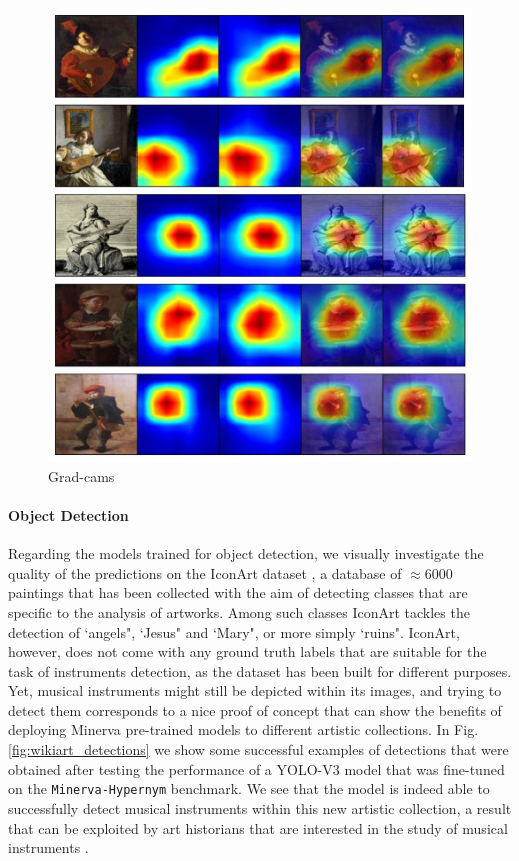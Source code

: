 \begin{figure}[ht!]
\centering
  \includegraphics[width=\linewidth]{./Images/Chapter05/grad_cams}
  \caption{Grad-cams}
  \label{fig:grad_cams}
\end{figure}


\paragraph{Object Detection}
Regarding the models trained for object detection, we visually investigate the quality of the predictions on the IconArt dataset \cite{gonthier2018weakly}, a database of $\approx 6000$ paintings that has been collected with the aim of detecting classes that are specific to the analysis of artworks. Among such classes IconArt tackles the detection of `angels", `Jesus" and `Mary", or more simply `ruins". IconArt, however, does not come with any ground truth labels that are suitable for the task of instruments detection, as the dataset has been built for different purposes. Yet, musical instruments might still be depicted within its images, and trying to detect them corresponds to a nice proof of concept that can show the benefits of deploying Minerva pre-trained models to different artistic collections. In Fig. \ref{fig:wikiart_detections} we show some successful examples of detections that were obtained after testing the performance of a YOLO-V3 model that was fine-tuned on the \texttt{Minerva-Hypernym} benchmark. We see that the model is indeed able to successfully detect musical instruments within this new artistic collection, a result that can be exploited by art historians that are interested in the study of musical instruments .   

